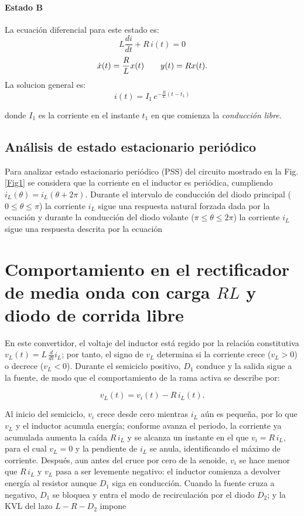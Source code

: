 \documentclass[conference]{IEEEtran}
\begin{document}
\paragraph{Estado B}
La ecuación diferencial para este estado es:
\[
L\frac{di}{dt} + R\,i(t) = 0
\]
\[
\dot{x}(t)
=
\-\dfrac{R}{L}
x(t)
\qquad
y(t)=Rx(t).
\]
La solucion general es:
\begin{equation}
i(t)=I_1\,e^{-\frac{R}{L}(t-t_1)}
\label{ecu2}
\end{equation}

donde \(I_1\) es la corriente en el instante \(t_1\) en que comienza la \emph{conducción libre}.
\subsection{Análisis de estado estacionario periódico}
Para analizar estado estacionario periódico (PSS) del circuito mostrado en la Fig. \ref{Fig1} se considera que la corriente en el inductor
es periódica, cumpliendo $i_L(\theta)=i_L(\theta+2\pi)$. Durante el intervalo de conducción del diodo principal ($0 \leq \theta \leq \pi$) la corriente $i_L$ sigue una respuesta natural forzada
dada por la ecuación y durante la conducción del diodo volante ($\pi \leq \theta \leq 2\pi$) la corriente $i_L$ sigue una respuesta descrita por la ecuación

\section{Comportamiento en el rectificador de media onda con carga $RL$ y diodo de corrida libre}
En este convertidor, el voltaje del inductor está regido por la relación constitutiva $v_L(t)=L\,\tfrac{d}{dt}i_L$; por tanto, el signo de $v_L$ determina si la corriente crece ($v_L>0$) o decrece ($v_L<0$). Durante el semiciclo positivo, $D_1$ conduce y la salida sigue a la fuente, de modo que el comportamiento de la rama activa se describe por:

\begin{equation*}
	v_L(t)=v_i(t)-R\,i_L(t).
\end{equation*}

Al inicio del semiciclo, $v_i$ crece desde cero mientras $i_L$ aún es pequeña, por lo que $v_L$ y el inductor acumula energía; conforme avanza el periodo, la corriente ya acumulada aumenta la caída $R\,i_L$ y se alcanza un instante en el que $v_i=R\,i_L$, para el cual $v_L=0$ y la pendiente de $i_L$ se anula, identificando el máximo de corriente. Después, aun antes del cruce por cero de la senoide, $v_i$ se hace menor que $R\,i_L$ y $v_L$ pasa a ser levemente negativo: el inductor comienza a devolver energía al resistor aunque $D_1$ siga en conducción. Cuando la fuente cruza a negativo, $D_1$ se bloquea y entra el modo de recirculación por el diodo $D_2$; y la KVL del lazo $L\!-\!R\!-\!D_2$ impone
\end{document}
